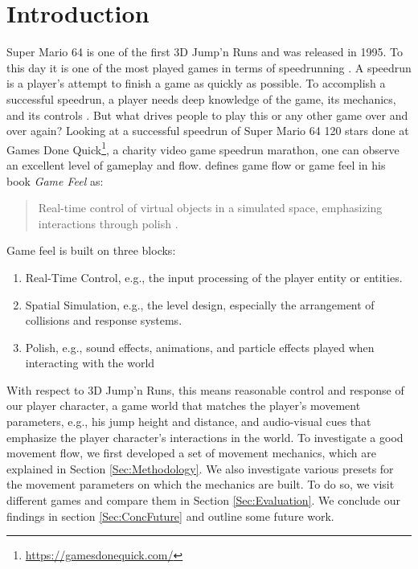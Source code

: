 \documentclass[conference]{IEEEtran}
\begin{document}
\section{Introduction}

Super Mario 64 \cite{SuperMario64} is one of the first 3D Jump'n Runs and was released in 1995.
To this day it is one of the most played games in terms of speedrunning \cite{SpeedrunDotCom}.
A speedrun is a player's attempt to finish a game as quickly as possible.
To accomplish a successful speedrun, a player needs deep knowledge of the game, its mechanics, and its controls \cite{speedrun}.
But what drives people to play this or any other game over and over again? 
Looking at a successful speedrun of Super Mario 64 120 stars \cite{Sm64Speed} done at Games Done Quick\footnote{\url{https://gamesdonequick.com/}}, a charity video game speedrun marathon, one can observe an excellent level of gameplay and flow. 
\cite{swink2008game} defines game flow or game feel in his book \textit{Game Feel} as:

\begin{quote}
    Real-time control of virtual objects in a simulated space, emphasizing interactions through polish \cite{swink2008game}.
\end{quote}

Game feel is built on three blocks:

\begin{enumerate}
    \item Real-Time Control, e.g., the input processing of the player entity or entities.
    \item Spatial Simulation, e.g., the level design, especially the arrangement of collisions and response systems.
    \item Polish, e.g., sound effects, animations, and particle effects played when interacting with the world
\end{enumerate}

With respect to 3D Jump'n Runs, this means reasonable control and response of our player character, a game world that matches the player's movement parameters, e.g., his jump height and distance, and audio-visual cues that emphasize the player character's interactions in the world.
To investigate a good movement flow, we first developed a set of movement mechanics, which are explained in Section \ref{Sec:Methodology}.
We also investigate various presets for the movement parameters on which the mechanics are built.
To do so, we visit different games and compare them in Section \ref{Sec:Evaluation}.
We conclude our findings in section \ref{Sec:ConcFuture} and outline some future work.
\end{document}
